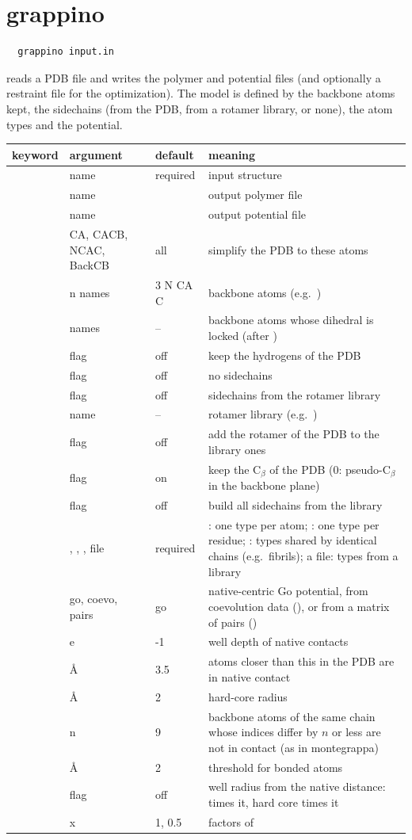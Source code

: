 \documentclass[11pt,a4paper]{article}
\newenvironment{keywords}
 {\begin{longtable}{>{\raggedright}p{0.2\textwidth}>{\raggedright}p{0.12\textwidth}>{\raggedright}p{0.14\textwidth}p{0.41\textwidth}}
  \toprule keyword & argument & default & meaning \\ \midrule \endhead
  \bottomrule \endfoot}
 {\end{longtable}}
\newcommand{\key}[4]{\kw{#1} & #2 & #3 & #4 \\}
\begin{document}
\section{grappino}
\label{sec:grappino}

\begin{Verbatim}
  grappino input.in
\end{Verbatim}
reads a PDB file and writes the polymer and potential files (and
optionally a restraint file for the optimization). The model is defined by
the backbone atoms kept, the sidechains (from the PDB, from a rotamer
library, or none), the atom types and the potential.

\begin{keywords}
\key{pdbfile}{name}{required}{input structure}
\key{polfile}{name}{\kw{polymer.pol}}{output polymer file}
\key{potfile}{name}{\kw{potential.pot}}{output potential file}
\key{model}{CA, CACB, NCAC, BackCB}{all}{simplify the PDB to these atoms}
\key{backbone_atoms}{n names}{3 N CA C}{backbone atoms (e.g.\ \kw{1 CA})}
\key{locked_atoms}{names}{--}{backbone atoms whose dihedral is locked (after \kw{backbone_atoms})}
\key{hydrogens}{flag}{off}{keep the hydrogens of the PDB}
\key{nosidechain}{flag}{off}{no sidechains}
\key{rotamers}{flag}{off}{sidechains from the rotamer library \kw{rotfile}}
\key{rotfile}{name}{--}{rotamer library (e.g.\ \kw{lib/rotamers.lib})}
\key{pdb_rot}{flag}{off}{add the rotamer of the PDB to the library ones}
\key{cb_pdb}{flag}{on}{keep the C$_\beta$ of the PDB (0: pseudo-C$_\beta$ in the backbone plane)}
\key{sidescratch}{flag}{off}{build all sidechains from the library}
\key{atomtypes}{\kw{go}, \kw{go_aa}, \kw{go_homo}, file}{required}{\kw{go}: one type per atom; \kw{go_aa}: one type per residue; \kw{go_homo}: types shared by identical chains (e.g.\ fibrils); a file: types from a library}
\key{potential}{go, coevo, pairs}{go}{native-centric Go potential, from coevolution data (\kw{coevofile}), or from a matrix of pairs (\kw{pairsfile})}
\key{go-energy}{e}{-1}{well depth of native contacts}
\key{r_native}{\AA}{3.5}{atoms closer than this in the PDB are in native contact}
\key{r_hardcore}{\AA}{2}{hard-core radius}
\key{imin}{n}{9}{backbone atoms of the same chain whose indices differ by $n$ or less are not in contact (as in montegrappa)}
\key{r_bonded}{\AA}{2}{threshold for bonded atoms}
\key{use_nativedist}{flag}{off}{well radius from the native distance: \kw{k_native_r} times it, hard core \kw{k_native_hc} times it}
\key{k_native_r, k_native_hc}{x}{1, 0.5}{factors of \kw{use_nativedist}}

\end{keywords}
\end{document}
